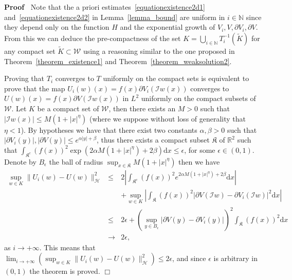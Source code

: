 \documentclass[a4paper,10pt]{article}
\newcommand{\mathd}{\mathrm{d}}
\newenvironment{proof}{\noindent\textbf{Proof\ }}{\hspace*{\fill}$\Box$\medskip}
\begin{document}
\begin{proof}
  Note that the a priori estimates~{\eqref{equationexistence2d1}}
  and~{\eqref{equationexistence2d2}} in Lemma~\ref{lemma_bound} are uniform in
  $i \in \mathbb{N}$ since they depend only on the function $H$ and the
  exponential growth of $V_i, V, \partial V_i, \partial V$. From this we can
  deduce the pre-compactness of the set $K = \bigcup_{i \in \mathbb{N}} T_i^{-
  1} (\tilde{K})$ for any compact set $\tilde{K} \subset \mathcal{W}$ using a
  reasoning similar to the one proposed in Theorem~\ref{theorem_existence1}
  and Theorem~\ref{theorem_weaksolution2}.
  
  Proving that $T_i$ converges to $T$ uniformly on the compact sets is
  equivalent to prove that the map $U_i (w) (x) = f (x) \partial V_i
  (\mathcal{I}w (x))$ converges to $U (w) (x) = f (x) \partial V (\mathcal{I}w
  (x))$ in $L^2$ uniformly on the compact subsets of $\mathcal{W}$. Let $K$ be
  a compact set of $\mathcal{W}$, then there exists an $M > 0$ such that $|
  \mathcal{I}w (x) | \leqslant M (1 + | x |^{\eta})$ (where we suppose without
  loss of generality that $\eta < 1$). By hypotheses we have that there exist
  two constants $\alpha, \beta > 0$ such that $| \partial V_i (y) |, |
  \partial V (y) | \leqslant e^{\alpha | y | + \beta}$, thus there exists a
  compact subset $\mathfrak{K}$ of $\mathbb{R}^2$ such that
  $\int_{\mathfrak{K}^c} (f (x))^2 \exp (2 \alpha M (1 + | x |^{\eta}) + 2
  \beta) \mathd x \leqslant \epsilon$, for some $\epsilon \in (0, 1)$. Denote
  by $B_{\epsilon}$ the ball of radius $\sup_{x \in \mathfrak{K}} M (1 + | x
  |^{\eta})$ then we have
  \begin{eqnarray}
    \sup_{w \in K} \| U_i (w) - U (w) \|^2_{\mathcal{H}} & \leqslant & 2
    \left| \int_{\mathfrak{K}^c} (f (x))^2 e^{2 \alpha M (1 + | x |^{\eta}) +
    2 \beta} \mathd x \right| \nonumber\\
    &  & + \sup_{w \in K} \left| \int_{\mathfrak{K}} (f (x))^2 | \partial V
    (\mathcal{I}w) - \partial V_i (\mathcal{I}w) |^2 \mathd x \right|
    \nonumber\\
    & \leqslant & 2 \epsilon + (\sup_{y \in B_{\epsilon}} | \partial V (y) -
    \partial V_i (y) |)^2 \int_{\mathfrak{K}} (f (x))^2 \mathd x \nonumber\\
    & \rightarrow & 2 \epsilon, \nonumber
  \end{eqnarray}
  as $i \rightarrow + \infty .$ This means that $\lim_{i \rightarrow + \infty}
  (\sup_{w \in K} \| U_i (w) - U (w) \|^2_{\mathcal{H}}) \leqslant 2
  \epsilon$, and since $\epsilon$ is arbitrary in $(0, 1)$ the theorem is
  proved. 
\end{proof}
\end{document}
